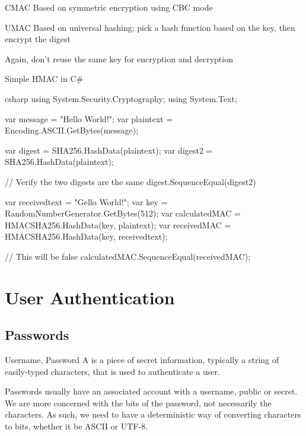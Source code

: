 \documentclass[code]{amznotes}
\begin{document}
\begin{dfnbox}{CMAC}{}
    Based on symmetric encryption using CBC mode
\end{dfnbox}


\begin{dfnbox}{UMAC}{}
    Based on universal hashing; pick a hash function based on the key, then encrypt the digest
\end{dfnbox}

Again, don't reuse the same key for encryption and decryption

\begin{codebox}{Simple HMAC in C\#}{}{}
    \begin{amzcode}{csharp}
using System.Security.Cryptography;
using System.Text;

var message = "Hello World!";
var plaintext = Encoding.ASCII.GetBytes(message);

var digest = SHA256.HashData(plaintext);
var digest2 = SHA256.HashData(plaintext);

// Verify the two digests are the same
digest.SequenceEqual(digest2)

var receivedtext = "Gello World!";
var key = RandomNumberGenerator.GetBytes(512);
var calculatedMAC = HMACSHA256.HashData(key, plaintext);
var receivedMAC = HMACSHA256.HashData(key, receivedtext);

// This will be false
calculatedMAC.SequenceEqual(receivedMAC);
    \end{amzcode}
\end{codebox}

\chapter{User Authentication}

\section{Passwords}

\begin{dfnbox}{Username, Password}{}
    A  is a piece of secret information, typically a string of easily-typed characters, that is used to authenticate a user.
\end{dfnbox}


Passwords usually have an associated account with a username, public or secret. We are more concerned with the bits of the password, not necessarily the characters. As such, we need to have a deterministic way of converting characters to bits, whether it be ASCII or UTF-8.
\end{document}
